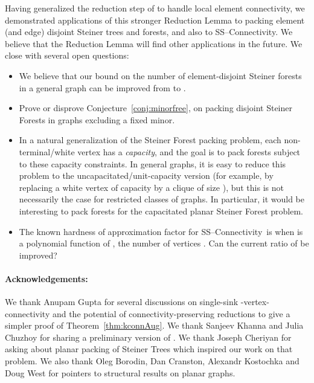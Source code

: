 \documentclass[11pt]{article}
\newcommand{\sskconn}{{\sc SS--Connectivity}}
\begin{document}
Having generalized the reduction step of \cite{hind} to handle local
element connectivity, we demonstrated applications of this stronger
Reduction Lemma to packing element (and edge) disjoint Steiner trees
and forests, and also to \sskconn. We believe that the Reduction Lemma
will find other applications in the future. We close with several open
questions:
\begin{itemize}
\item We believe that our bound on the number of element-disjoint
Steiner forests in a general graph can be improved from
 to .

\item Prove or disprove Conjecture~\ref{conj:minorfree}, on packing
  disjoint Steiner Forests in graphs excluding a fixed minor.

\item In a natural generalization of the Steiner Forest packing
  problem, each non-terminal/white vertex has a \emph{capacity}, and
  the goal is to pack forests subject to these capacity constraints.
  In general graphs, it is easy to reduce this problem to the
  uncapacitated/unit-capacity version (for example, by replacing a
  white vertex of capacity  by a clique of size ), but this is
  not necessarily the case for restricted classes of graphs. In
  particular, it would be interesting to pack  forests for
  the capacitated planar Steiner Forest problem.

\item The known hardness of approximation factor for \sskconn~is
   when  is a polynomial function of , the number
  of vertices \cite{KortsarzKL}. Can the current ratio of  be improved? 
\end{itemize}

\paragraph{Acknowledgements:} We thank Anupam Gupta for several
discussions on single-sink -vertex-connectivity and the potential
of connectivity-preserving reductions to give a simpler proof of
Theorem~\ref{thm:kconnAug}. We thank Sanjeev Khanna and Julia Chuzhoy
for sharing a preliminary version of \cite{ChuzhoyK08}.  We thank
Joseph Cheriyan for asking about planar packing of Steiner Trees which
inspired our work on that problem. We also thank Oleg Borodin, Dan
Cranston, Alexandr Kostochka and Doug West for pointers to structural
results on planar graphs.
\end{document}
